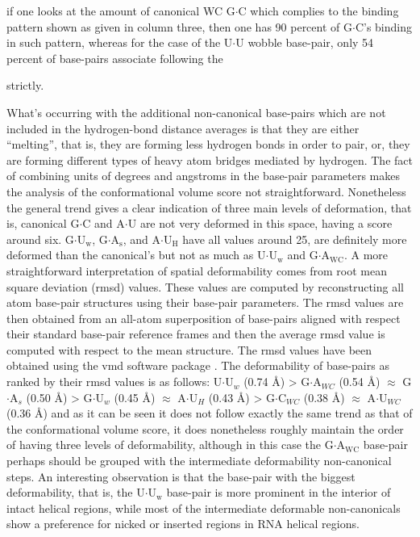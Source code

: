 if one looks
at the amount of canonical  WC G$\cdot$C which complies to the binding
pattern shown  as given in  column three, then  one has 90  percent of
G$\cdot$C's  binding in  such pattern,  whereas  for the  case of  the
U$\cdot$U wobble  base-pair, only  54 percent of  base-pairs associate
following the

strictly.

What's  occurring   with  the   additional  non-canonical
base-pairs  which  are  not  included in  the  hydrogen-bond  distance
averages  is that  they  are  either ``melting'',  that  is, they  are
forming less  hydrogen bonds  in order to  pair, or, they  are forming
different types of  heavy atom bridges mediated by  hydrogen. The fact
of  combining  units  of   degrees  and  angstroms  in  the  base-pair
parameters makes  the analysis of the conformational  volume score not
straightforward.   Nonetheless   the  general  trend   gives  a  clear
indication  of three main  levels of  deformation, that  is, canonical
G$\cdot$C and A$\cdot$U are not  very deformed in this space, having a
score around  six. G$\cdot$U$_{\text{w}}$, G$\cdot$A$_{\text{s}}$, and
A$\cdot$U$_{\text{H}}$ have all values  around 25, are definitely more
deformed    than    the   canonical's    but    not    as   much    as
U$\cdot$U$_{\text{w}}$    and    G$\cdot$A$_{\text{WC}}$.    A    more
straightforward  interpretation of  spatial  deformability comes  from
root mean square deviation (rmsd) values. These values are computed by
reconstructing  all atom  base-pair structures  using  their base-pair
parameters.   The  rmsd values  are  then  obtained  from an  all-atom
superposition  of  base-pairs  aligned  with  respect  their  standard
base-pair reference frames and then the average rmsd value is computed
with respect to the mean structure. The rmsd values have been obtained
using the  vmd software package  \cite{eargle2006}.  The deformability
of  base-pairs  as  ranked  by   their  rmsd  values  is  as  follows:
U$\cdot$U$_{w}$  (0.74 \AA)  > G$\cdot$A$_{WC}$  (0.54  \AA) $\approx$
G$\cdot$A$_{s}$  (0.50  \AA) >  G$\cdot$U$_{w}$  (0.45 \AA)  $\approx$
A$\cdot$U$_{H}$  (0.43 \AA)  > G$\cdot$C$_{WC}$  (0.38  \AA) $\approx$
A$\cdot$U$_{WC}$ (0.36 \AA)  and as it can be seen  it does not follow
exactly the same trend as  that of the conformational volume score, it
does nonetheless roughly maintain the  order of having three levels of
deformability,  although  in  this  case  the  G$\cdot$A$_{\text{WC}}$
base-pair   perhaps   should   be   grouped  with   the   intermediate
deformability non-canonical steps.  An interesting observation is that
the   base-pair  with   the  biggest   deformability,  that   is,  the
U$\cdot$U$_{\text{w}}$ base-pair is more  prominent in the interior of
intact  helical regions,  while  most of  the intermediate  deformable
non-canonicals show a preference for nicked or inserted regions in RNA
helical regions.


